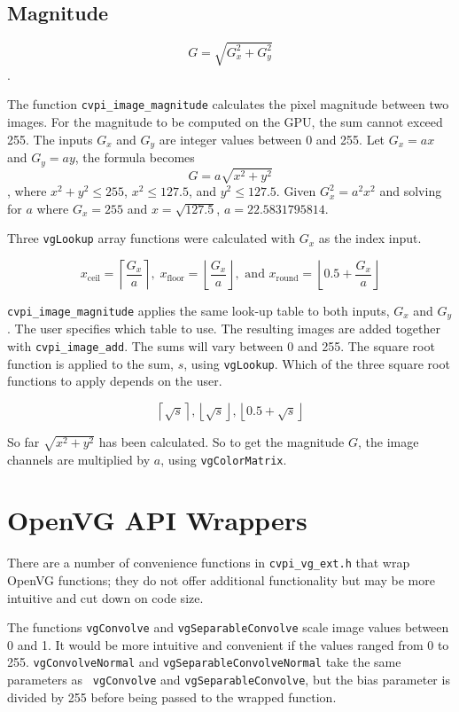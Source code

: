 \documentclass[12pt]{report}
\begin{document}
\subsection{Magnitude}
\label{sec-3-2-1}
\[G = \sqrt{G_x^2+ G_y^2}\].

The function {\tt cvpi\_image\_magnitude} calculates the pixel
magnitude between two images. For the magnitude to be computed on the
GPU, the sum cannot exceed 255. The inputs $G_x$ and $G_y$ are integer
values between 0 and 255. Let $G_x = ax$ and $G_y = ay$, the formula
becomes
\[G = a\sqrt{x^2+ y^2}\],
where $x^2+y^2 \le 255$, $x^2\le 127.5$,
and $y^2\le 127.5$.
Given $G_x^2 = a^2x^2$ and solving for $a$ where $G_x=255$ and
$x=\sqrt{127.5}$, $a = 22.5831795814$.

Three {\tt vgLookup} array functions were calculated with $G_x$ as the
index input.

\[x_{\text{ceil}} = \left\lceil\frac{G_x}{a}\right\rceil,\; x_{\text{floor}} =
  \left\lfloor\frac{G_x}{a}\right\rfloor,\text{ and } x_{\text{round}} = \left\lfloor0.5+\frac{G_x}{a}\right\rfloor\]

{\tt cvpi\_image\_magnitude} applies the same look-up table to both inputs,
$G_x$ and $G_y$. The user specifies which table to use. The
resulting images are added together with {\tt cvpi\_image\_add}. The sums
will vary between 0 and 255. The square root function is applied to
the sum, $s$, using {\tt vgLookup}. Which of the three square root
functions to apply depends on the user.

\[\left\lceil\sqrt{s}\right\rceil,\left\lfloor\sqrt{s}\right\rfloor,\left\lfloor0.5+\sqrt{s}\right\rfloor\]

So far $\sqrt{x^2+ y^2}$ has been calculated. So to get the
magnitude $G$, the image channels are multiplied by $a$, using
{\tt vgColorMatrix}.
\section{OpenVG API Wrappers}
\label{sec-3-3}
There are a number of convenience functions in {\tt cvpi\_vg\_ext.h} that
wrap OpenVG functions; they do not offer additional functionality
but may be more intuitive and cut down on code size.

The functions {\tt vgConvolve} and {\tt vgSeparableConvolve} scale
image values between 0 and 1. It would be more intuitive and
convenient if the values ranged from 0 to 255. {\tt vgConvolveNormal}
and {\tt vgSeparableConvolveNormal} take the same parameters as {\tt
  vgConvolve} and {\tt vgSeparableConvolve}, but the bias
parameter is divided by 255 before being passed to the wrapped
function.
\end{document}
